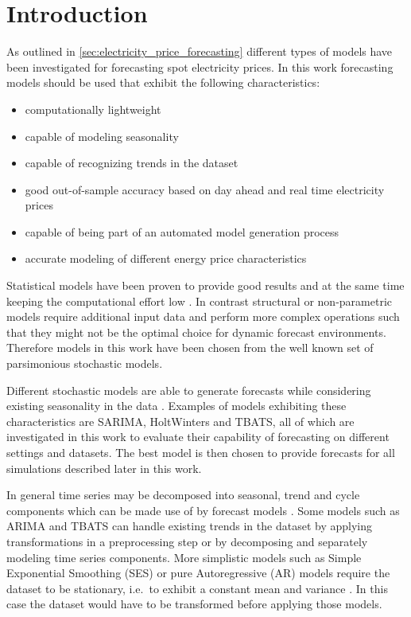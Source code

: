 
\section{Introduction}

As outlined in \ref{sec:electricity_price_forecasting} different types of models have been investigated for forecasting spot electricity prices. In this work forecasting models should be used that exhibit the following characteristics: 

\begin{itemize}
	\item computationally lightweight
	\item capable of modeling seasonality
	\item capable of recognizing trends in the dataset
	\item good out-of-sample accuracy based on day ahead and real time electricity prices
	\item capable of being part of an automated model generation process
	\item accurate modeling of different energy price characteristics
\end{itemize}

Statistical models have been proven to provide good results and at the same time keeping the computational effort low \cite{aggarwal2009electricity,bunn2003forecasting}. In contrast structural or non-parametric models require additional input data and perform more complex operations such that they might not be the optimal choice for dynamic forecast environments. Therefore models in this work have been chosen from the well known set of parsimonious stochastic models. 

Different stochastic models are able to generate forecasts while considering existing seasonality in the data \cite{gould2008forecasting,de2011forecasting}. Examples of models exhibiting these characteristics are SARIMA, HoltWinters and TBATS, all of which are investigated in this work to evaluate their capability of forecasting on different settings and datasets. The best model is then chosen to provide forecasts for all simulations described later in this work. 

In general time series may be decomposed into seasonal, trend and cycle components which can be made use of by forecast models \cite{de2011forecasting}. Some models such as ARIMA and TBATS can handle existing trends in the dataset by applying transformations in a preprocessing step or by decomposing and separately modeling time series components. More simplistic models such as Simple Exponential Smoothing (SES) or pure Autoregressive (AR) models require the dataset to be stationary, i.e.~to exhibit a constant mean and variance \cite{weron2007modeling,hyndman2012forecasting}. In this case the dataset would have to be transformed before applying those models. 

